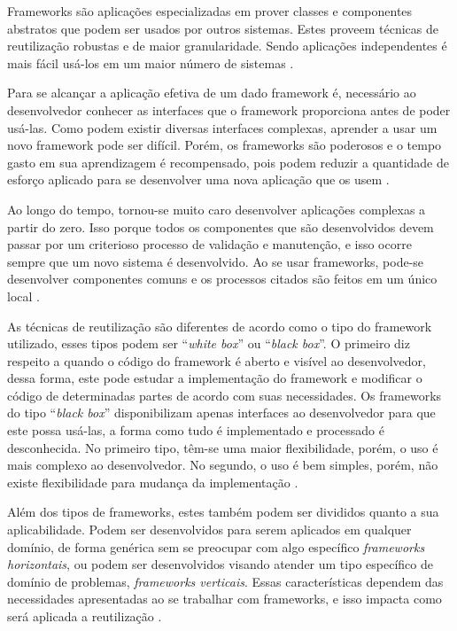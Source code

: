 Frameworks são aplicações especializadas em prover classes e componentes abstratos que podem ser usados por outros sistemas. Estes proveem técnicas de reutilização robustas e de maior granularidade. Sendo aplicações independentes é mais fácil usá-los em um maior número de sistemas \cite{Johnson:Foote:1988}.

Para se alcançar a aplicação efetiva de um dado framework é, necessário ao desenvolvedor conhecer as interfaces que o framework proporciona antes de poder usá-las. Como podem existir diversas interfaces complexas, aprender a usar um novo framework pode ser difícil. Porém, os frameworks são poderosos e o tempo gasto em sua aprendizagem é recompensado, pois podem reduzir a quantidade de esforço aplicado para se desenvolver uma nova aplicação que os usem \cite{Johnson:1997}.

Ao longo do tempo, tornou-se muito caro desenvolver aplicações complexas a partir do zero. Isso porque todos os componentes que são desenvolvidos devem passar por um criterioso processo de validação e manutenção, e isso ocorre sempre que um novo sistema é desenvolvido. Ao se usar frameworks, pode-se desenvolver componentes comuns e os processos citados são feitos em um único local \cite{Fayad:Schimidt:1997}.

As técnicas de reutilização são diferentes de acordo como o tipo do framework utilizado, esses tipos podem ser ``\textit{white box}'' ou ``\textit{black box}''. O primeiro diz respeito a quando o código do framework é aberto e visível ao desenvolvedor, dessa forma, este pode estudar a implementação do framework e modificar o código de determinadas partes de acordo com suas necessidades. Os frameworks do tipo ``\textit{black box}'' disponibilizam apenas interfaces ao desenvolvedor para que este possa usá-las, a forma como tudo é implementado e processado é desconhecida. No primeiro tipo, têm-se uma maior flexibilidade, porém, o uso é mais complexo ao desenvolvedor. No segundo, o uso é bem simples, porém, não existe flexibilidade para mudança da implementação \cite{Kroth:2000}.

Além dos tipos de frameworks, estes também podem ser divididos quanto a sua aplicabilidade. Podem ser desenvolvidos para serem aplicados em qualquer domínio, de forma genérica sem se preocupar com algo específico \textit{frameworks horizontais}, ou podem ser desenvolvidos visando atender um tipo específico de domínio de problemas, \textit{frameworks verticais}. Essas características dependem das necessidades apresentadas ao se trabalhar com frameworks, e isso impacta como será aplicada a reutilização \cite{Kroth:2000}.

